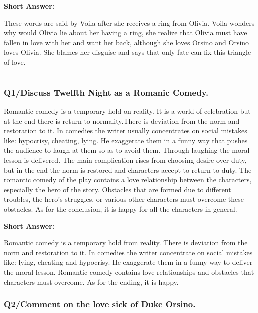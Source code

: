 \documentclass[12pt, a4paper]{article}
\begin{document}
\textbf{Short Answer:}\smallbreak

These words are said by Voila after she receives a ring from Olivia. Voila
wonders why would Olivia lie about her having a ring, she realize that 
Olivia must have fallen in love with her and want her back, although
she loves Orsino and Orsino loves Olivia. She blames  her disguise and 
says that only fate can fix this triangle of love.



\section*{}\bigbreak

\subsubsection*{Q1/Discuss Twelfth Night as a Romanic Comedy.}
Romantic comedy is a temporary hold on reality. It is a world of 
celebration but at the end there is return to normality.There is 
deviation from
the norm and restoration to it. In comedies the writer usually 
concentrates on social mistakes like: hypocrisy, cheating, lying. He
exaggerate them in a funny way that pushes the audience to laugh at them so as to avoid them. 
Through laughing the moral lesson is delivered. The main complication
rises from choosing desire over duty, but in the end the norm is
restored and characters accept to return to duty. The romantic comedy
of the play contains a love relationship between the characters, 
especially the hero of the story. Obstacles that are formed due to 
different troubles, the hero's struggles, or various other characters
must overcome these obstacles. As for the conclusion, it is happy for 
all the characters in general.\medbreak

\textbf{Short Answer:}\smallbreak

Romantic comedy is a temporary hold from reality. There is deviation from
the norm and restoration to it. In comedies the writer concentrate on
social mistakes like: lying, cheating and hypocrisy. He exaggerate them
in a funny way to deliver the moral lesson. Romantic comedy contains
love relationships and obstacles that characters must overcome. As
for the ending, it is happy.

\subsubsection*{Q2/Comment on the love sick of Duke Orsino.}
\end{document}
